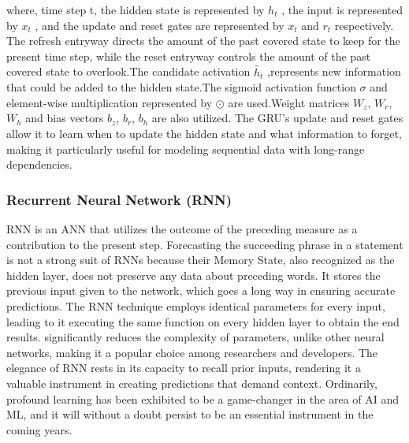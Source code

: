 \documentclass[a4paper,fleqn]{cas-dc}
\begin{document}

where, time step t, the hidden state is represented by $ h_t $ , the input is represented by $ x_t $ , and the update and reset gates are
represented by $ x_t $ and $ r_t$ respectively. The refresh entryway directs the amount of the past covered state to keep for the present time step, while the reset entryway controls the amount of the past covered state to overlook.The candidate activation $\tilde{h_t}$ ,represents new information that could be added to the hidden state.The sigmoid activation function $ \sigma $ and element-wise multiplication represented by $\odot$ are used.Weight matrices $ W_z $, $ W_r $, $ W_h $ and bias vectors $ b_z $, $ b_r $, $ b_h $ are also utilized. The GRU's update and reset gates allow it to learn when to update the hidden state and what information to forget, making it particularly useful for modeling sequential data with long-range dependencies.
\subsubsection{Recurrent Neural Network (RNN)}
RNN is an ANN that utilizes the outcome of the preceding measure as a contribution to the present step. Forecasting the succeeding phrase in a statement is not a strong suit of RNNs because their Memory State, also recognized as the hidden layer, does not preserve any data about preceding words. It stores the previous input given to the network, which goes a long way in ensuring accurate predictions. The RNN technique employs identical parameters for every input, leading to it executing the same function on every hidden layer to obtain the end results. significantly reduces the complexity of parameters, unlike other neural networks, making it a popular choice among researchers and developers. The elegance of RNN rests in its capacity to recall prior inputs, rendering it a valuable instrument in creating predictions that demand context. Ordinarily, profound learning has been exhibited to be a game-changer in the area of AI and ML, and it will without a doubt persist to be an essential instrument in the coming years.
\end{document}
